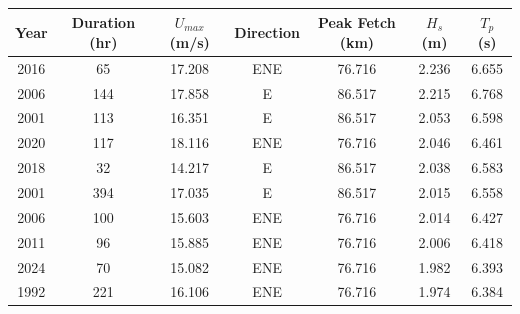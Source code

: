 \begin{tabular}{ccccccc}
\hline
Year & Duration (hr) & $U_{max}$ (m/s) & Direction & Peak Fetch (km) & $H_s$ (m) & $T_p$ (s) \\
\hline
2016 & 65 & 17.208 & ENE & 76.716 & 2.236 & 6.655 \\
2006 & 144 & 17.858 & E & 86.517 & 2.215 & 6.768 \\
2001 & 113 & 16.351 & E & 86.517 & 2.053 & 6.598 \\
2020 & 117 & 18.116 & ENE & 76.716 & 2.046 & 6.461 \\
2018 & 32 & 14.217 & E & 86.517 & 2.038 & 6.583 \\
2001 & 394 & 17.035 & E & 86.517 & 2.015 & 6.558 \\
2006 & 100 & 15.603 & ENE & 76.716 & 2.014 & 6.427 \\
2011 & 96 & 15.885 & ENE & 76.716 & 2.006 & 6.418 \\
2024 & 70 & 15.082 & ENE & 76.716 & 1.982 & 6.393 \\
1992 & 221 & 16.106 & ENE & 76.716 & 1.974 & 6.384 \\
\hline
\end{tabular}
